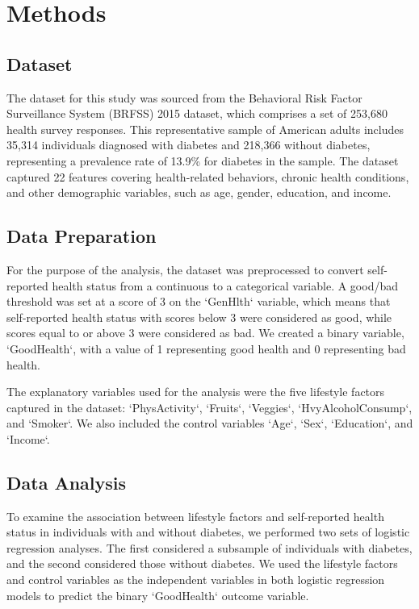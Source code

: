 \documentclass[12pt]{article}
\begin{document}
\section{Methods}

\subsection{Dataset}
The dataset for this study was sourced from the Behavioral Risk Factor Surveillance System (BRFSS) 2015 dataset, which comprises a set of 253,680 health survey responses. This representative sample of American adults includes 35,314 individuals diagnosed with diabetes and 218,366 without diabetes, representing a prevalence rate of 13.9\% for diabetes in the sample. The dataset captured 22 features covering health-related behaviors, chronic health conditions, and other demographic variables, such as age, gender, education, and income.

\subsection{Data Preparation}
For the purpose of the analysis, the dataset was preprocessed to convert self-reported health status from a continuous to a categorical variable. A good/bad threshold was set at a score of 3 on the `GenHlth` variable, which means that self-reported health status with scores below 3 were considered as good, while scores equal to or above 3 were considered as bad. We created a binary variable, `GoodHealth`, with a value of 1 representing good health and 0 representing bad health.

The explanatory variables used for the analysis were the five lifestyle factors captured in the dataset: `PhysActivity`, `Fruits`, `Veggies`, `HvyAlcoholConsump`, and `Smoker`. We also included the control variables `Age`, `Sex`, `Education`, and `Income`.

\subsection{Data Analysis}
To examine the association between lifestyle factors and self-reported health status in individuals with and without diabetes, we performed two sets of logistic regression analyses. The first considered a subsample of individuals with diabetes, and the second considered those without diabetes. We used the lifestyle factors and control variables as the independent variables in both logistic regression models to predict the binary `GoodHealth` outcome variable.
\end{document}
